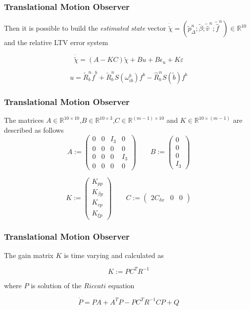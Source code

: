 \documentclass{beamer}
\begin{document}
	\begin{frame}
		\frametitle{Translational Motion Observer}
		Then it is possible to build the \textit{estimated state} vector $\dot{\tilde{\chi}} = (\tilde{p}^n_\Delta;\tilde{\beta}; \tilde{\hat{v}}^n; \tilde{\hat{f}}^n) \in \mathds{R}^{10}$ and the relative LTV error system
		
		\[ \dot{\tilde{\chi}} = (A - KC)\tilde{\chi} + Bu + B\epsilon_u + K\varepsilon\]
		
		\[ u = \tilde{R}^n_b \dot{f}^b + \tilde{R}^n_b S(\omega^b_{ib})f^b - \hat{R}^n_b S(\tilde{b})f^b\]
	\end{frame}

	\begin{frame}
		\frametitle{Translational Motion Observer}
		The matrices $A \in \mathbb{R}^{10\times 10}$,$B \in \mathbb{R}^{10\times 3}$,$C \in \mathds{R}^{(m-1) \times 10} $ and $K \in \mathds{R}^{10 \times (m-1)}$ are described as follows
		$$
		A :=
		\begin{pmatrix}
		0 & 0 & I_3 & 0 \\ 
		0 & 0 & 0 & 0 \\
		0 & 0 & 0 & I_3 \\
		0 & 0 & 0 & 0
		\end{pmatrix}
		\qquad
		B := 
		\begin{pmatrix}
		0 \\ 0 \\ 0 \\ I_3
		\end{pmatrix}
		$$
		
		$$
		K := 
		\begin{pmatrix}
		K_{pp} \\ K_{\beta p} \\ K_{vp} \\ K_{\xi p}
		\end{pmatrix}
		\qquad
		C :=
		\begin{pmatrix}
		2C_{\delta x} & 0 & 0
		\end{pmatrix}
		$$
	\end{frame}

	\begin{frame}
		\frametitle{Translational Motion Observer}
		The gain matrix $K$ is time varying and calculated as
		
		\[ K := PC^TR^{-1} \]
		
		 where $P$ is solution of the $Riccati$ equation
		
		\[ \dot{P} = PA + A^TP - PC^TR^{-1}CP + Q\]
	\end{frame}
	
\end{document}
